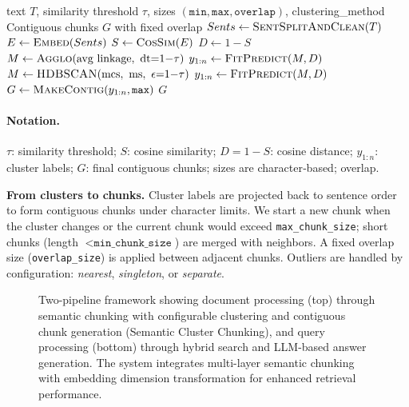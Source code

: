 \documentclass[10pt,twocolumn,letterpaper]{article}
\begin{document}
\begin{algorithm}[!ht]
\caption{Semantic Cluster Chunking}\label{alg:cfg_chunk}
\footnotesize
\begin{algorithmic}[1]
\Require text $T$, similarity threshold $\tau$, sizes $(\texttt{min},\texttt{max},\texttt{overlap})$, clustering\_method
\Ensure Contiguous chunks $G$ with fixed overlap
\State $Sents \gets \Call{SentSplitAndClean}{T}$ 
\State $E \gets \Call{Embed}{Sents}$ 
\State $S \gets \Call{CosSim}{E}$ 
\State $D \gets 1{-}S$ 
  \State $M \gets \Call{Agglo}{\text{avg linkage},\ \text{dt}{=}1{-}\tau}$
  \State $y_{1:n}\gets \Call{FitPredict}{M, D}$
\Else
  \State $M \gets \Call{HDBSCAN}{\text{mcs},\ \text{ms},\ \epsilon{=}1{-}\tau}$
  \State $y_{1:n}\gets \Call{FitPredict}{M, D}$ 
  \State {}
\EndIf
\State $G \gets \Call{MakeContig}{y_{1:n}, \texttt{max}}$ 
\State {} 
\State {} 
\State \Return $G$
\end{algorithmic}
\end{algorithm}

\paragraph{Notation.}
$\tau$: similarity threshold; $S$: cosine similarity; $D{=}1{-}S$: cosine distance; $y_{1:n}$: cluster labels; $G$: final contiguous chunks; sizes are character‑based; overlap.

\vspace{0.5em}
\textbf{From clusters to chunks.} Cluster labels are projected back to sentence order to form contiguous chunks under character limits. We start a new chunk when the cluster changes or the current chunk would exceed \texttt{max\_chunk\_size}; short chunks (length $<\texttt{min\_chunk\_size}$) are merged with neighbors. A fixed overlap size (\texttt{overlap\_size}) is applied between adjacent chunks. Outliers are handled by configuration: \emph{nearest}, \emph{singleton}, or \emph{separate}.

\begin{figure}[!htbp]
    \centering
    
    \caption{Two-pipeline framework showing document processing (top) through semantic chunking with configurable clustering and contiguous chunk generation (Semantic Cluster Chunking), and query processing (bottom) through hybrid search and LLM-based answer generation. The system integrates multi-layer semantic chunking with embedding dimension transformation for enhanced retrieval performance.}
    \label{fig:rag_architecture}
\end{figure}
\end{document}
